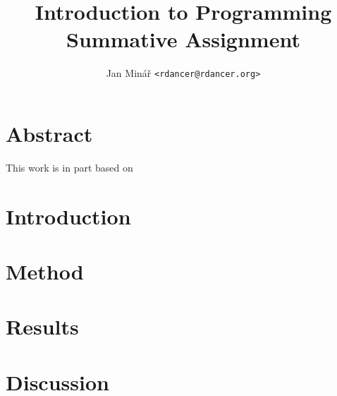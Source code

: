 \documentclass[10pt]{report}
\author{Jan Minář {\tt <rdancer@rdancer.org>}}
\title{Introduction to Programming\\Summative Assignment}
\begin{document}


\maketitle



\chapter{Abstract}
\thispagestyle{fancy}
This work is in part based on \cite{minar}

\chapter{Introduction}
\thispagestyle{fancy}

\chapter{Method}
\thispagestyle{fancy}

\chapter{Results}
\thispagestyle{fancy}

\chapter{Discussion}
\thispagestyle{fancy}
\end{document}
